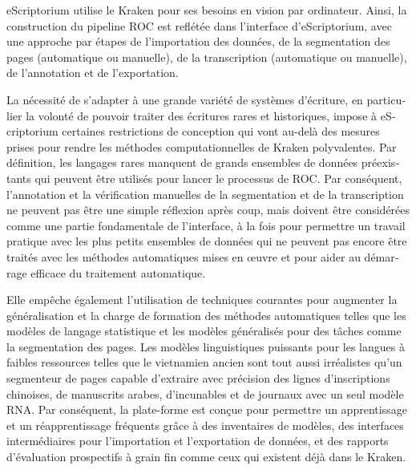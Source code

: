 \begin{french}
eScriptorium utilise le Kraken pour ses besoins en vision par ordinateur.
Ainsi, la construction du pipeline ROC est reflétée dans l'interface
d'eScriptorium, avec une approche par étapes de l'importation des données, de
la segmentation des pages (automatique ou manuelle), de la transcription
(automatique ou manuelle), de l'annotation et de l'exportation.

La nécessité de s'adapter à une grande variété de systèmes d'écriture, en
particulier la volonté de pouvoir traiter des écritures rares et historiques,
impose à eScriptorium certaines restrictions de conception qui vont au-delà des
mesures prises pour rendre les méthodes computationnelles de Kraken
polyvalentes. Par définition, les langages rares manquent de grands ensembles
de données préexistants qui peuvent être utilisés pour lancer le processus de
ROC.  Par conséquent, l'annotation et la vérification manuelles de la
segmentation et de la transcription ne peuvent pas être une simple réflexion
après coup, mais doivent être considérées comme une partie fondamentale de
l'interface, à la fois pour permettre un travail pratique avec les plus petits
ensembles de données qui ne peuvent pas encore être traités avec les méthodes
automatiques mises en œuvre et pour aider au démarrage efficace du traitement
automatique.

Elle empêche également l'utilisation de techniques courantes pour augmenter la
généralisation et la charge de formation des méthodes automatiques telles que
les modèles de langage statistique et les modèles généralisés pour des tâches
comme la segmentation des pages. Les modèles linguistiques puissants pour les
langues à faibles ressources telles que le vietnamien ancien sont tout aussi
irréalistes qu'un segmenteur de pages capable d'extraire avec précision des
lignes d'inscriptions chinoises, de manuscrits arabes, d'incunables et de
journaux avec un seul modèle RNA. Par conséquent, la plate-forme est conçue
pour permettre un apprentissage et un réapprentissage fréquents grâce à des
inventaires de modèles, des interfaces intermédiaires pour l'importation et
l'exportation de données, et des rapports d'évaluation prospectifs à grain fin
comme ceux qui existent déjà dans le Kraken.


\end{french}
